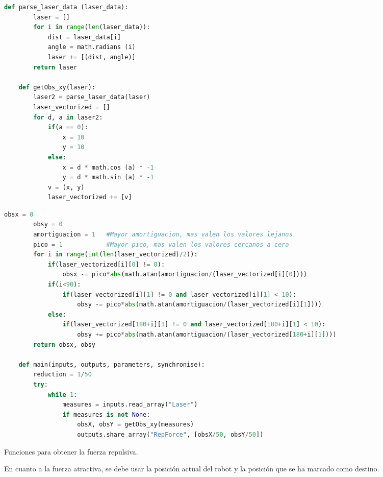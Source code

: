 \begin{code}[H]
    \begin{lstlisting}[language=python]
    def parse_laser_data (laser_data):
        laser = []
        for i in range(len(laser_data)):
            dist = laser_data[i]
            angle = math.radians (i)
            laser += [(dist, angle)]
        return laser
    
    def getObs_xy(laser):
        laser2 = parse_laser_data(laser)
        laser_vectorized = []
        for d, a in laser2:
            if(a == 0):
                x = 10
                y = 10
            else:
                x = d * math.cos (a) * -1
                y = d * math.sin (a) * -1
            v = (x, y)
            laser_vectorized += [v]
    \end{lstlisting}
\end{code}
\begin{code}[H]
    \begin{lstlisting}[language=python]
        obsx = 0
        obsy = 0    
        amortiguacion = 1   #Mayor amortiguacion, mas valen los valores lejanos
        pico = 1            #Mayor pico, mas valen los valores cercanos a cero
        for i in range(int(len(laser_vectorized)/2)):
            if(laser_vectorized[i][0] != 0):
                obsx -= pico*abs(math.atan(amortiguacion/(laser_vectorized[i][0])))
            if(i<90):
                if(laser_vectorized[i][1] != 0 and laser_vectorized[i][1] < 10):
                    obsy -= pico*abs(math.atan(amortiguacion/(laser_vectorized[i][1])))
            else:
                if(laser_vectorized[180+i][1] != 0 and laser_vectorized[180+i][1] < 10):
                    obsy += pico*abs(math.atan(amortiguacion/(laser_vectorized[180+i][1])))
        return obsx, obsy

    def main(inputs, outputs, parameters, synchronise):
        reduction = 1/50
        try:
            while 1:    
                measures = inputs.read_array("Laser")
                if measures is not None:
                    obsX, obsY = getObs_xy(measures)
                    outputs.share_array("RepForce", [obsX/50, obsY/50])
    \end{lstlisting}
    \caption[Funciones para obtener la fuerza repulsiva]{Funciones para obtener la fuerza repulsiva.}
    \label{cod:parse_laser_data}
\end{code}

En cuanto a la fuerza atractiva, se debe usar la posición actual del robot y la posición que se ha marcado como destino. 

